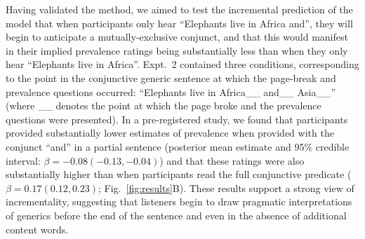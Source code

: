 \documentclass[letterpaper, 12pt]{article}
\newcommand{\denote}[1]{\mbox{ $[\![ #1 ]\!]$}}
\begin{document}




Having validated the method, we aimed to test the incremental prediction of the model that when participants only hear ``Elephants live in Africa and'', they will begin to anticipate a mutually-exclusive conjunct, and that this would manifest in their implied prevalence ratings being substantially less than when they only hear ``Elephants live in Africa''.
Expt.~2 contained three conditions, corresponding to the point in the conjunctive generic sentence at which the page-break and prevalence questions occurred: ``Elephants live in Africa\_\_ and\_\_ Asia\_\_'' (where \_\_ denotes the point at which the page broke and the prevalence questions were presented).
In a pre-registered study, we found that participants provided substantially lower estimates of prevalence when provided with the conjunct ``and'' in a partial sentence (posterior mean estimate and 95\% credible interval: $\beta = -0.08 (-0.13, -0.04)$) and that these ratings were also substantially higher than when participants read the full conjunctive predicate ($\beta = 0.17 (0.12, 0.23)$; Fig.~\ref{fig:results}B). 
These results support a strong view of incrementality, suggesting that listeners begin to draw pragmatic interpretations of generics before the end of the sentence and even in the absence of additional content words. 










\setlength{\bibleftmargin}{.125in}
\setlength{\bibindent}{-\bibleftmargin}


\renewcommand\bibname{}
\scriptsize
%
\end{document}
